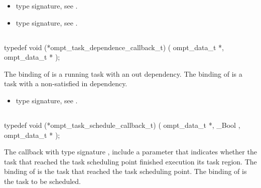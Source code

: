 \crossreferences
\begin{itemize}
\item {} type signature, see
.
\item {} type signature, see
.
\end{itemize}



\subsection{}
\label{subsec:ompt_task_dependence_callback_t}
\format
\begin{boxedcode}
typedef void (*ompt\_task\_dependence\_callback\_t) (
  ompt\_data\_t *,
  ompt\_data\_t *
);
\end{boxedcode}
\descr
The binding of  is a running task with an out dependency.
The binding of  is a task with a non-satisfied in dependency.

\crossreferences
\begin{itemize}
\item {} type signature, see
.
\end{itemize}



\subsection{}
\label{subsec:ompt_task_schedule_callback_t}
\format
\begin{boxedcode}
typedef void (*ompt\_task\_schedule\_callback\_t) (
  ompt\_data\_t *,
  \_Bool ,
  ompt\_data\_t *
);
\end{boxedcode}
\descr
The callback with type signature ,
include a parameter 
that indicates whether the task that reached the task scheduling point finished
execution its task region.
The binding of  is the task that reached the task scheduling point.
The binding of  is the task to be scheduled.

